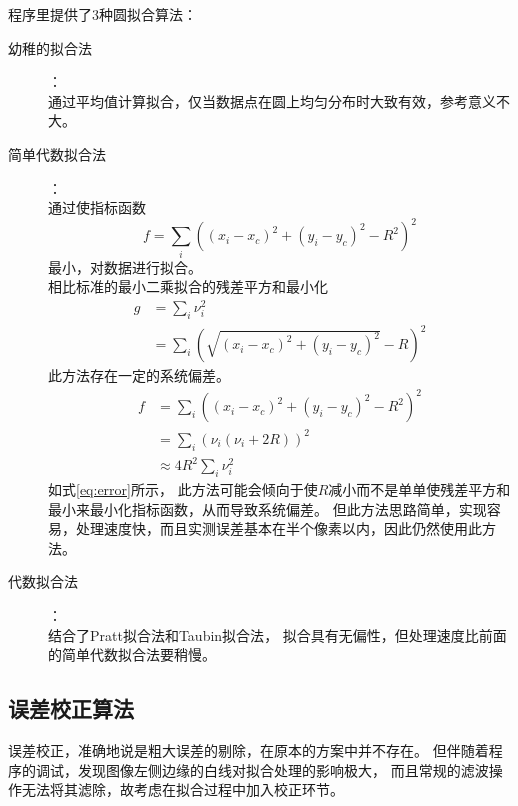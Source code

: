 \documentclass[12pt,a4paper]{article}
\begin{document}
程序里提供了3种圆拟合算法：
\begin{description}
    \item[幼稚的拟合法] ：\\
        通过平均值计算拟合，仅当数据点在圆上均匀分布时大致有效，参考意义不大。
    \item[简单代数拟合法] ：\\
        通过使指标函数
        \begin{equation}
            f = \sum_i \left((x_i - x_c)^2 + (y_i - y_c)^2 - R^2\right)^2
        \end{equation}
        最小，对数据进行拟合。\\
        相比标准的最小二乘拟合的残差平方和最小化
        \begin{equation}
        \begin{split}
            g &= \sum_i \nu _i^2 \\
              &= \sum_i \left(\sqrt{(x_i - x_c)^2 + (y_i - y_c)^2} - R\right)^2
        \end{split}
        \end{equation}
        此方法存在一定的系统偏差\cite{Al2009Error}。
        \begin{equation}\label{eq:error}
        \begin{split}
            f &= \sum_i \left((x_i - x_c)^2 + (y_i - y_c)^2 - R^2\right)^2 \\
              &= \sum_i \left(\nu _i (\nu _i+2R) \right)^2 \\
              &\approx 4 R^2 \sum_i \nu _i ^2
        \end{split}
        \end{equation}
        如式\eqref{eq:error}所示，
        此方法可能会倾向于使$R$减小而不是单单使残差平方和最小来最小化指标函数，从而导致系统偏差。
        但此方法思路简单，实现容易，处理速度快，而且实测误差基本在半个像素以内，因此仍然使用此方法。
    \item[代数拟合法] \cite{Al2009Error}：\\
        结合了Pratt拟合法\cite{MR987653}和Taubin拟合法\cite{Taubin1991Estimation}，
        拟合具有无偏性，但处理速度比前面的简单代数拟合法要稍慢。
\end{description}

\subsection{误差校正算法}

误差校正，准确地说是粗大误差的剔除，在原本的方案中并不存在。
但伴随着程序的调试，发现图像左侧边缘的白线对拟合处理的影响极大，
而且常规的滤波操作无法将其滤除，故考虑在拟合过程中加入校正环节。
\end{document}
